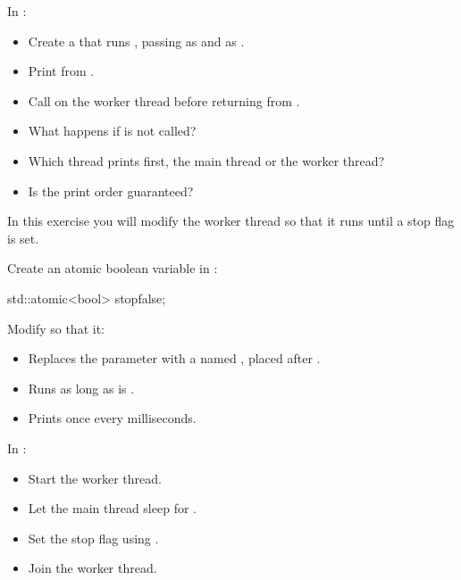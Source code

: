 \label{c6:ex:1.2}
In :
\begin{itemize}
  \item Create a  that runs , passing  as
     and  as .
  \item Print  from .
  \item Call  on the worker thread before returning from .
\end{itemize}

\begin{itemize}
  \item What happens if  is not called?
  \item Which thread prints first, the main thread or the worker thread?
  \item Is the print order guaranteed?
\end{itemize}

\label{c6:ex:1.3}
In this exercise you will modify the worker thread so that it runs until a stop flag is set.

Create an atomic boolean variable in :

\begin{cppcode}
std::atomic<bool> stop{false};
\end{cppcode}

\noindent Modify  so that it:
\begin{itemize}
  \item Replaces the  parameter with a  named
    , placed after .
  \item Runs as long as  is .
  \item Prints  once every  milliseconds.
\end{itemize}
In :
\begin{itemize}
  \item Start the worker thread.
  \item Let the main thread sleep for .
  \item Set the stop flag using .
  \item Join the worker thread.
\end{itemize}

